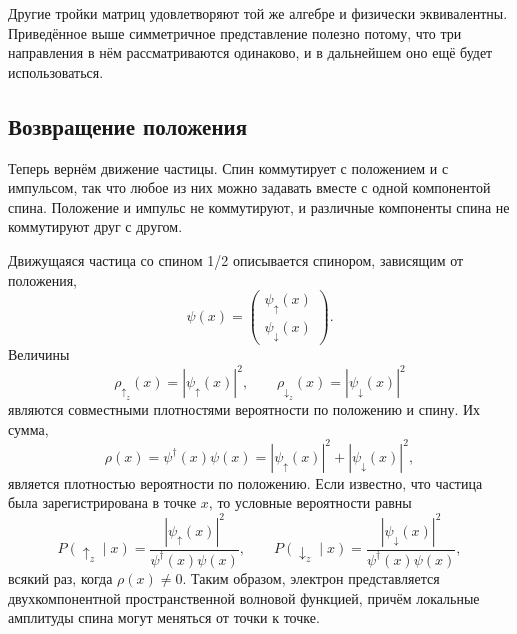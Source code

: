 \begin{classroomqa}
\end{classroomqa}

Другие тройки матриц удовлетворяют той же алгебре и физически эквивалентны. Приведённое выше симметричное представление полезно потому, что три направления в нём рассматриваются одинаково, и в дальнейшем оно ещё будет использоваться.

\subsection{Возвращение положения}

Теперь вернём движение частицы. Спин коммутирует с положением и с импульсом, так что любое из них можно задавать вместе с одной компонентой спина. Положение и импульс не коммутируют, и различные компоненты спина не коммутируют друг с другом.

Движущаяся частица со спином 1/2 описывается спинором, зависящим от положения,
\begin{equation}
\psi(x)=
\begin{pmatrix}
\psi_\uparrow(x)\\
\psi_\downarrow(x)
\end{pmatrix}.
\end{equation}
Величины
\begin{equation}
\rho_{\uparrow_z}(x)=|\psi_\uparrow(x)|^2,
\qquad
\rho_{\downarrow_z}(x)=|\psi_\downarrow(x)|^2
\end{equation}
являются совместными плотностями вероятности по положению и спину. Их сумма,
\begin{equation}
\rho(x)=\psi^\dagger(x)\psi(x)
=|\psi_\uparrow(x)|^2+|\psi_\downarrow(x)|^2,
\end{equation}
является плотностью вероятности по положению. Если известно, что частица была зарегистрирована в точке \(x\), то условные вероятности равны
\begin{equation}
P(\uparrow_z\mid x)
=
\frac{|\psi_\uparrow(x)|^2}{\psi^\dagger(x)\psi(x)},
\qquad
P(\downarrow_z\mid x)
=
\frac{|\psi_\downarrow(x)|^2}{\psi^\dagger(x)\psi(x)},
\end{equation}
всякий раз, когда \(\rho(x)\neq0\). Таким образом, электрон представляется двухкомпонентной пространственной волновой функцией, причём локальные амплитуды спина могут меняться от точки к точке.

